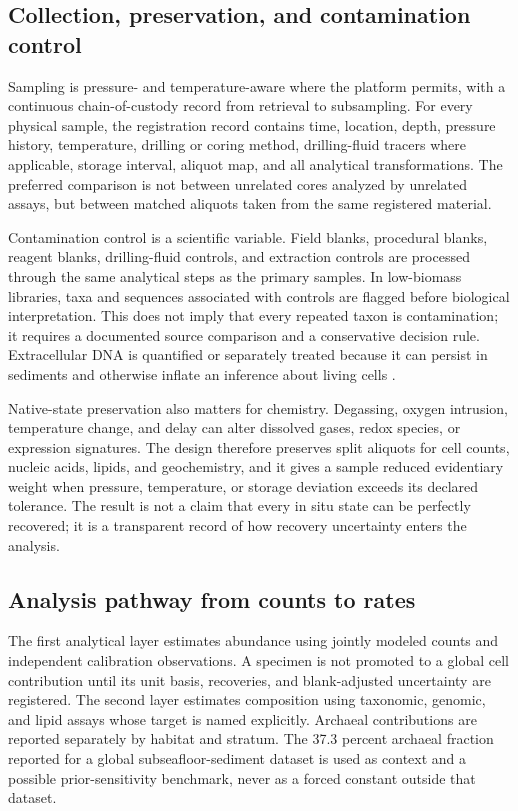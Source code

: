\documentclass[conference]{../../../../Conference-LaTeX-template_10-17-19/IEEEtran}
\begin{document}
\subsection{Collection, preservation, and contamination control}
Sampling is pressure- and temperature-aware where the platform permits, with a continuous chain-of-custody record from retrieval to subsampling. For every physical sample, the registration record contains time, location, depth, pressure history, temperature, drilling or coring method, drilling-fluid tracers where applicable, storage interval, aliquot map, and all analytical transformations. The preferred comparison is not between unrelated cores analyzed by unrelated assays, but between matched aliquots taken from the same registered material.

Contamination control is a scientific variable. Field blanks, procedural blanks, reagent blanks, drilling-fluid controls, and extraction controls are processed through the same analytical steps as the primary samples. In low-biomass libraries, taxa and sequences associated with controls are flagged before biological interpretation. This does not imply that every repeated taxon is contamination; it requires a documented source comparison and a conservative decision rule. Extracellular DNA is quantified or separately treated because it can persist in sediments and otherwise inflate an inference about living cells \cite{torti2015}.

Native-state preservation also matters for chemistry. Degassing, oxygen intrusion, temperature change, and delay can alter dissolved gases, redox species, or expression signatures. The design therefore preserves split aliquots for cell counts, nucleic acids, lipids, and geochemistry, and it gives a sample reduced evidentiary weight when pressure, temperature, or storage deviation exceeds its declared tolerance. The result is not a claim that every in situ state can be perfectly recovered; it is a transparent record of how recovery uncertainty enters the analysis.

\subsection{Analysis pathway from counts to rates}
The first analytical layer estimates abundance using jointly modeled counts and independent calibration observations. A specimen is not promoted to a global cell contribution until its unit basis, recoveries, and blank-adjusted uncertainty are registered. The second layer estimates composition using taxonomic, genomic, and lipid assays whose target is named explicitly. Archaeal contributions are reported separately by habitat and stratum. The 37.3 percent archaeal fraction reported for a global subseafloor-sediment dataset \cite{hoshino2018} is used as context and a possible prior-sensitivity benchmark, never as a forced constant outside that dataset.
\end{document}

